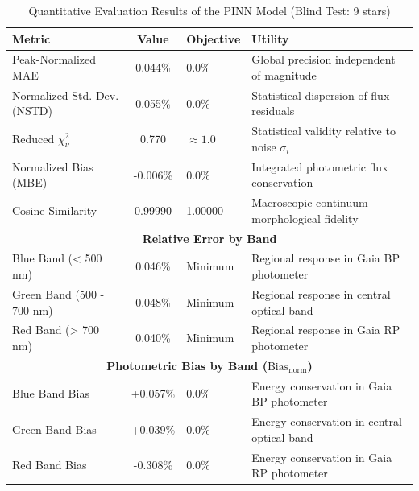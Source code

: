 
\begin{table}[htpb]
\centering
\caption{Quantitative Evaluation Results of the PINN Model (Blind Test: 9 stars)}
\label{tab:pinn_evaluation}
\begin{tabular}{lcll}
\hline
\textbf{Metric} & \textbf{Value} & \textbf{Objective} & \textbf{Utility} \\
\hline
Peak-Normalized MAE & 0.044\% & 0.0\% & Global precision independent of magnitude \\
Normalized Std. Dev. (NSTD) & 0.055\% & 0.0\% & Statistical dispersion of flux residuals \\
Reduced $\chi^2_\nu$ & 0.770 & $\approx 1.0$ & Statistical validity relative to noise $\sigma_i$ \\
Normalized Bias (MBE) & -0.006\% & 0.0\% & Integrated photometric flux conservation \\
Cosine Similarity & 0.99990 & 1.00000 & Macroscopic continuum morphological fidelity \\
\hline
\multicolumn{4}{c}{\textbf{Relative Error by Band}} \\
\hline
Blue Band (< 500 nm) & 0.046\% & Minimum & Regional response in Gaia BP photometer \\
Green Band (500 - 700 nm) & 0.048\% & Minimum & Regional response in central optical band \\
Red Band (> 700 nm) & 0.040\% & Minimum & Regional response in Gaia RP photometer \\
\hline
\multicolumn{4}{c}{\textbf{Photometric Bias by Band ($\text{Bias}_{\text{norm}}$)}} \\
\hline
Blue Band Bias & +0.057\% & 0.0\% & Energy conservation in Gaia BP photometer \\
Green Band Bias & +0.039\% & 0.0\% & Energy conservation in central optical band \\
Red Band Bias & -0.308\% & 0.0\% & Energy conservation in Gaia RP photometer \\
\hline
\end{tabular}
\end{table}
